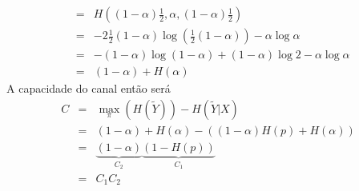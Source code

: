 \begin{questions}
\begin{solution}
\begin{eqnarray}
        &=& H\left( (1 - \alpha) \frac{1}{2} , \alpha , (1 - \alpha) \frac{1}{2} \right) \nonumber \\
        &=& - 2 \frac{1}{2} (1 - \alpha) \log \left( \frac{1}{2} (1 - \alpha) \right) - \alpha \log \alpha \nonumber \\
        &=& -(1-\alpha) \log (1-\alpha) + (1-\alpha) \log 2 - \alpha \log \alpha \nonumber \\
        &=&  (1-\alpha) + H(\alpha)
\end{eqnarray}
A capacidade do canal então será
\begin{eqnarray}
C &=& \max_{\pi} \left( H(\tilde{Y}) \right) - H(\tilde{Y}|X) \nonumber \\
        &=& (1-\alpha) + H(\alpha) - ( (1-\alpha) H(p) + H(\alpha) ) \nonumber \\
        &=& \underbrace{(1-\alpha)}_{C_2} \underbrace{(1 - H(p))}_{C_1} \nonumber \\
        &=& C_1 C_2
\end{eqnarray}



\end{solution}
\end{questions}

